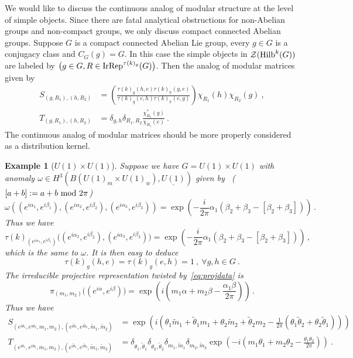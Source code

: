 \documentclass[a4paper,11pt]{article}
\newtheorem{exm}[lemma]{Example}
\newcommand{\be}{\begin{equation}}
\newcommand{\ee}{\end{equation}}
\newcommand{\ba}{\begin{aligned}}
\newcommand{\ea}{\end{aligned}}
\def\CZ{\mathcal{Z}}
\def\hilb{{\rm Hilb}}
\begin{document}
We would like to discuss the continuous analog of modular structure at the level of simple objects. Since there are fatal analytical obstructions for non-Abelian groups and non-compact groups, we only discuss compact connected Abelian groups. Suppose $G$ is a compact connected Abelian Lie group, every $g\in G$ is a conjugacy class and $C_G(g) = G$. In this case the simple objects in $\CZ(\hilb^k(G))$ are labeled by $\big(g\in G,R\in {\rm IrRep}^{\tau(k)_g}(G)\big)$. Then the analog of modular matrices given by~\cite{Coste:2000tq}
\be\ba S_{(g,R_1),(h,R_2)} &= \left(\frac{\tau(k)_g(h,e)\tau(k)_h(g,e)}{\tau(k)_g(e,h)\tau(k)_h(e,g)}\right) \chi_{R_1}(h) \chi_{R_2}(g)  \ , \\
T_{(g,R_1),(h,R_2)} &= \delta_{g,h}\delta_{R_1,R_2} \frac{\chi^*_{R_1}(g)}{\chi_{R_1}(e)} \ .
\ea\ee
The continuous analog of modular matrices should be more properly considered as a distribution kernel.
\begin{exm}[$U(1)\times U(1)$]
    Suppose we have $G= U(1)\times U(1) $ with anomaly $\omega\in H^3(B(U(1)_m\times U(1)_w),\underline{U(1)})$ given by~\cite{Jia:2025uun} ($[a+b]:= a+b \ {\rm mod} \ 2\pi$)
    \be
\omega((e^{i\alpha_1},e^{i\beta_1}),(e^{i\alpha_2},e^{i\beta_2}),(e^{i\alpha_3},e^{i\beta_3}))=\exp\left(-\frac{i}{2\pi}\alpha_1(\beta_2+\beta_3-[\beta_2+\beta_3])\right)\,.
\ee
Thus we have \be \label{eq:projdata}\tau(k)_{(e^{i\alpha_1},e^{i\beta_1})}\big((e^{i\alpha_2},e^{i\beta_2}),(e^{i\alpha_3},e^{i\beta_3})\big) = \exp\left(-\frac{i}{2\pi}\alpha_1(\beta_2+\beta_3-[\beta_2+\beta_3])\right)\,,\ee
which is the same to $\omega$. It is then easy to deduce 
\be\tau(k)_g(h,e) = \tau(k)_g(e,h) = 1\ , \ \forall g,h\in G \ . \ee
The irreducible projective representation twisted by~\eqref{eq:projdata} is
\be \pi_{(m_1,m_2)}\big( (e^{i\alpha},e^{i\beta}) \big) = \exp\left(  i \left(m_1\alpha + m_2\beta-\frac{\alpha_1\beta}{2\pi}\right) \right)\,. \ee
Thus we have
\be\ba
\label{eq:STMats}
S_{(e^{i\theta_1},e^{i\theta_2},m_1,m_2),(e^{i\tilde{\theta}_1},e^{i\tilde{\theta}_2},\tilde{m}_1,\tilde{m}_2)}&=\exp\left(i(\theta_1\tilde{m}_1+\tilde{\theta}_1 m_1+\theta_2\tilde{m}_2+\tilde{\theta}_2 m_2-\frac{1}{2\pi}(\theta_1\tilde{\theta}_2+\theta_2\tilde{\theta}_1))\right) \\
T_{(e^{i\theta_1},e^{i\theta_2},m_1,m_2),(e^{i\tilde{\theta}_1},e^{i\tilde{\theta}_2},\tilde{m}_1,\tilde{m}_2)} &= \delta_{\theta_1,\tilde{\theta}_1}\delta_{\theta_2,\tilde{\theta}_2} \delta_{m_1,\tilde{m}_1}\delta_{m_2,\tilde{m}_2}\exp\left(  -i \left(m_1\theta_1 + m_2\theta_2-\frac{\theta_1\theta_2}{2\pi}\right) \right) \ .
\ea\ee
\end{exm}
\end{document}
